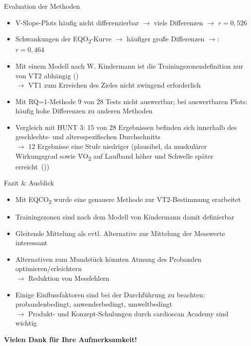 \documentclass[colorBG,slideColor,8pt]{beamer}
\newcommand{\eqotwo}{EQO\textsubscript{2}}
\newcommand{\eqcotwo}{EQCO\textsubscript{2}}
\newcommand{\votwo}{\.{V}O\textsubscript{2}}
\begin{document}
\begin{frame}{Evaluation der Methoden}
\begin{itemize}
	\item V-Slope-Plots häufig nicht differenzierbar $\rightarrow$ viele Differenzen $\rightarrow$ $r = 0,526$
	\item Schwankungen der \eqotwo-Kurve $\rightarrow$ häufiger große Differenzen $\rightarrow$: $r = 0,464$
	\item Mit einem Modell nach W. Kindermann ist die Trainingszonendefinition nur von VT2 abhängig (\cite{Kindermann.2004})\\$\rightarrow$ VT1 zum Erreichen des Zieles nicht zwingend erforderlich
	\item Mit RQ=1-Methode 9 von 28 Tests nicht auswertbar; bei auswertbaren Plots: häufig hohe Differenzen zu anderen Methoden
	\item Vergleich mit HUNT 3: 15 von 28 Ergebnissen befinden sich innerhalb des geschlechts- und altersspezifischen Durchschnitts\\$\rightarrow$ 12 Ergebnisse eine Stufe niedriger (plausibel, da muskulärer Wirkungsgrad sowie \votwo{} auf Laufband höher und Schwelle später erreicht~(\cite{Kroidl.2015}))
\end{itemize}
\end{frame}

\begin{frame}{Fazit \& Ausblick}
\begin{itemize}
	\item Mit \eqcotwo{} wurde eine genauere Methode zur VT2-Bestimmung erarbeitet
	\item Trainingszonen sind nach dem Modell von Kindermann damit definierbar
	\item Gleitende Mittelung als evtl. Alternative zur Mittelung der Messwerte interessant
	\item Alternativen zum Mundstück könnten Atmung des Probanden optimieren/erleichtern\\$\rightarrow$ Reduktion von Messfehlern
	\item Einige Einflussfaktoren sind bei der Durchführung zu beachten: probandenbedingt, anwenderbedingt, umweltbedingt\\$\rightarrow$ Produkt- und Konzept-Schulungen durch cardioscan Academy sind wichtig
\end{itemize}
\end{frame}

\begin{frame}
\begin{center}
	\large{\textbf{Vielen Dank für Ihre Aufmerksamkeit!}}
\end{center}
\end{frame}
\end{document}
